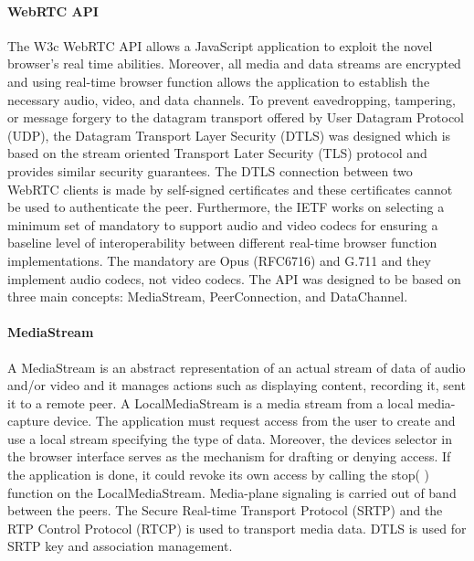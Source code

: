 \paragraph{WebRTC API }
The W3c WebRTC API allows a JavaScript application to exploit the novel browser’s real time abilities. Moreover, all media
and data streams are encrypted and using real-time browser function  allows the application to establish the necessary 
audio, video, and data channels. 
To prevent eavedropping, tampering, or message forgery to the datagram transport offered by User Datagram Protocol (UDP),
the Datagram Transport Layer Security (DTLS) was designed which is based on the stream oriented Transport Later Security 
(TLS) protocol and provides similar security guarantees. The DTLS connection between two WebRTC clients is made by 
self-signed certificates and these certificates cannot be used to authenticate the peer. 
Furthermore, the IETF works on selecting a minimum set of mandatory to support audio and video codecs for ensuring a 
baseline level of interoperability between different real-time browser function implementations. The mandatory are Opus
(RFC6716) and G.711 and they implement audio codecs, not video codecs. 
The API was designed to be based on three main concepts: MediaStream, PeerConnection, and DataChannel. 

\paragraph{MediaStream}
A MediaStream is an abstract representation of an actual stream of data of audio and/or video and it
manages actions such as displaying content, recording it, sent it to a remote peer. 
A LocalMediaStream is a media stream from a local media-capture device. The application must request access
from the user to create and use a local stream specifying the type of data. Moreover, the devices selector in the
browser interface serves as the mechanism for drafting or denying access. If the application is done, it could
revoke its own access by calling the stop( ) function on the LocalMediaStream. 
Media-plane signaling is carried out of band between the peers. The Secure Real-time Transport Protocol (SRTP)
and the RTP Control Protocol (RTCP) is used to transport media data. DTLS is used for SRTP key and association management. 


